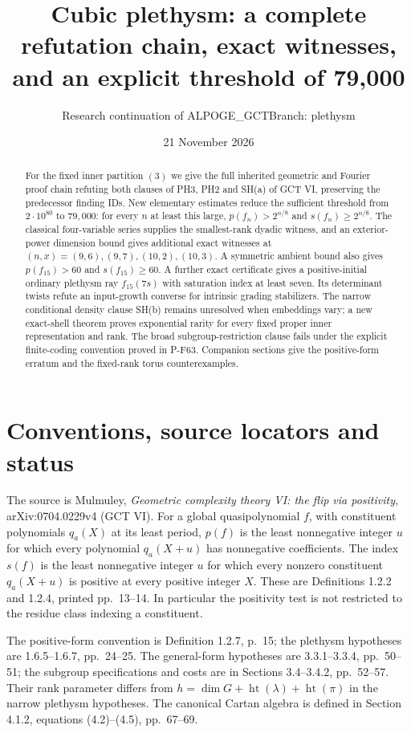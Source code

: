 \documentclass[11pt,a4paper]{article}
\title{Cubic plethysm: a complete refutation chain, exact witnesses,\\
and an explicit threshold of 79,000}
\author{Research continuation of ALPOGE\_GCT\quad Branch: plethysm}
\date{21 November 2026}
\begin{document}
\maketitle
\begin{abstract}
For the fixed inner partition $(3)$ we give the full inherited
geometric and Fourier proof chain refuting both clauses of PH3,
PH2 and SH(a) of GCT VI, preserving the predecessor finding IDs.
New elementary estimates reduce the sufficient threshold from
$2\cdot10^{80}$ to $79,000$: for every $n$ at least this large,
$p(f_n)>2^{n/8}$ and $s(f_n)\ge2^{n/8}$.
The classical four-variable series supplies the smallest-rank
dyadic witness, and an exterior-power dimension bound gives
additional exact witnesses at $(n,x)=(9,6),(9,7),(10,2),(10,3)$.
A symmetric ambient bound also gives $p(f_{15})>60$ and
$s(f_{15})\ge60$.
A further exact certificate gives a positive-initial ordinary
plethysm ray $f_{15}(7s)$ with saturation index at least seven.
Its determinant twists refute an input-growth converse for
intrinsic grading stabilizers.  The narrow conditional density
clause SH(b) remains unresolved when embeddings vary; a new
exact-shell theorem proves exponential rarity for every fixed
proper inner representation and rank.  The broad subgroup-restriction
clause fails under the explicit finite-coding convention proved
in P-F63.  Companion sections give the positive-form erratum and
the fixed-rank torus counterexamples.
\end{abstract}
\tableofcontents

\section{Conventions, source locators and status}
The source is Mulmuley, \emph{Geometric complexity theory VI:
the flip via positivity}, arXiv:0704.0229v4 (GCT VI).
For a global quasipolynomial $f$, with constituent polynomials
$q_a(X)$ at its least period, $p(f)$ is the least nonnegative
integer $u$ for which every polynomial $q_a(X+u)$ has
nonnegative coefficients.  The index $s(f)$ is the least
nonnegative integer $u$ for which every nonzero constituent
$q_a(X+u)$ is positive at every positive integer $X$.
These are Definitions 1.2.2 and 1.2.4, printed pp.~13--14.
In particular the positivity test is not restricted to the
residue class indexing a constituent.

The positive-form convention is Definition 1.2.7, p.~15;
the plethysm hypotheses are 1.6.5--1.6.7, pp.~24--25.
The general-form hypotheses are 3.3.1--3.3.4, pp.~50--51;
the subgroup specifications and costs are in Sections
3.4--3.4.2, pp.~52--57.  Their rank parameter differs from
$h=\dim G+\operatorname{ht}(\lambda)+\operatorname{ht}(\pi)$
in the narrow plethysm hypotheses.  The canonical Cartan algebra
is defined in Section 4.1.2, equations (4.2)--(4.5), pp.~67--69.
\end{document}

